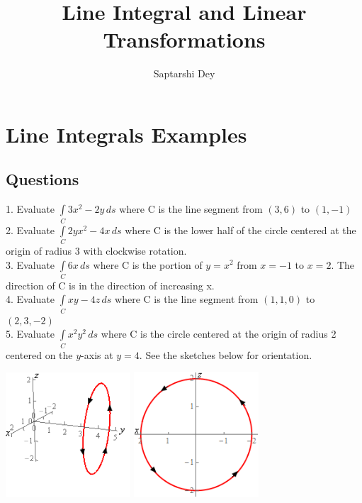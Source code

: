 \documentclass[14pt]{article}
\begin{document}
	\title{Line Integral and Linear Transformations}
	\author{Saptarshi Dey}
	\maketitle
	\section{Line Integrals Examples}
	\subsection{Questions}
	\large{
		1. Evaluate $\displaystyle \int\limits_{C}{{3{x^2} - 2y \,ds}}$ where C is the line segment from $\left( {3,6} \right)$ to $\left( {1,-1} \right)$}
	\\ \large{
		2. Evaluate $\displaystyle \int\limits_{C}{{2y{x^2} - 4x\,ds}}$ where C is the lower half of the circle centered at the origin of radius 3 with clockwise rotation.}
	\\ \large{
		3. Evaluate $\displaystyle \int\limits_{C}{{6x\,ds}}$ where C is the portion of $y = {x^2}$ from $x=-1$ to $x=2$. The direction of C is in the direction of increasing x.}
	\\ \large{
		4. Evaluate $\displaystyle \int\limits_{C}{{xy - 4z\,ds}}$ where C is the line segment from $\left( {1,1,0} \right)$ to $\left( {2,3,-2} \right)$}
	\\ \large{
		5. Evaluate $\displaystyle \int\limits_{C}{{{x^2}{y^2}\,ds}}$ where C is the circle centered at the origin of radius 2 centered on the $y$-axis at $y=4$. See the sketches below for orientation.}
	\\ \begin{center}
		\includegraphics[width=0.35\textwidth]{"./Pictures/Q5_1.png"}
		\includegraphics[width=0.35\textwidth]{"./Pictures/Q5_2.png"}
	\end{center}
\end{document}
